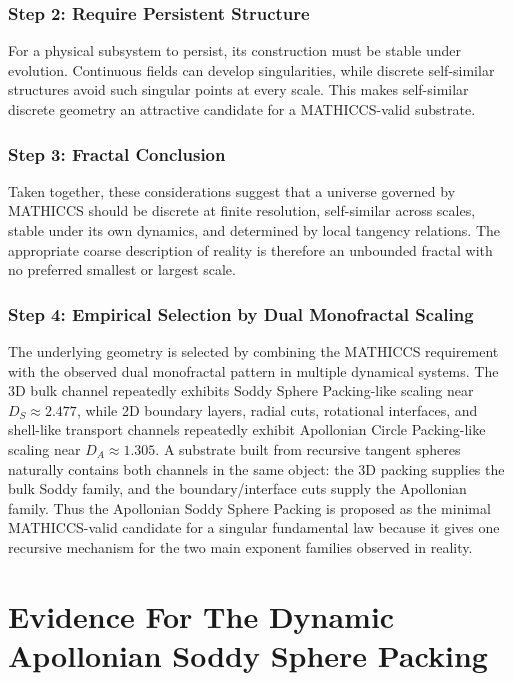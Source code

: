 \documentclass[11pt,a4paper]{article}
\begin{document}
\subsubsection{Step 2: Require Persistent Structure}
For a physical subsystem to persist, its construction must be stable under evolution. Continuous fields can develop singularities, while discrete self-similar structures avoid such singular points at every scale. This makes self-similar discrete geometry an attractive candidate for a MATHICCS-valid substrate.

\subsubsection{Step 3: Fractal Conclusion}
Taken together, these considerations suggest that a universe governed by MATHICCS should be discrete at finite resolution, self-similar across scales, stable under its own dynamics, and determined by local tangency relations. The appropriate coarse description of reality is therefore an unbounded fractal with no preferred smallest or largest scale.

\subsubsection{Step 4: Empirical Selection by Dual Monofractal Scaling}
The underlying geometry is selected by combining the MATHICCS requirement with the observed dual monofractal pattern in multiple dynamical systems. The 3D bulk channel repeatedly exhibits Soddy Sphere Packing-like scaling near \(D_S\approx2.477\), while 2D boundary layers, radial cuts, rotational interfaces, and shell-like transport channels repeatedly exhibit Apollonian Circle Packing-like scaling near \(D_A\approx1.305\). A substrate built from recursive tangent spheres naturally contains both channels in the same object: the 3D packing supplies the bulk Soddy family, and the boundary/interface cuts supply the Apollonian family. Thus the Apollonian Soddy Sphere Packing is proposed as the minimal MATHICCS-valid candidate for a singular fundamental law because it gives one recursive mechanism for the two main exponent families observed in reality.


\section{Evidence For The Dynamic Apollonian Soddy Sphere Packing}
\end{document}
